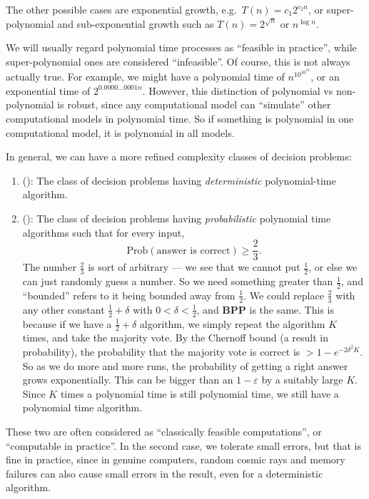 The other possible cases are exponential growth, e.g.\ $T(n) = c_1 2^{c_2 n}$, or super-polynomial and sub-exponential growth such as $T(n) = 2^{\sqrt{n}}$ or $n^{\log n}$.

We will usually regard polynomial time processes as ``feasible in practice'', while super-polynomial ones are considered ``infeasible''. Of course, this is not always actually true. For example, we might have a polynomial time of $n^{10^{10^{10}}}$, or an exponential time of $2^{0.0000\ldots0001 n}$. However, this distinction of polynomial vs non-polynomial is robust, since any computational model can ``simulate'' other computational models in polynomial time. So if something is polynomial in one computational model, it is polynomial in all models.

In general, we can have a more refined complexity classes of decision problems:
\begin{enumerate}
  \item {} (): The class of decision problems having \emph{deterministic} polynomial-time algorithm.
  \item {} (): The class of decision problems having \emph{probabilistic} polynomial time algorithms such that for every input,
    \[
      \mathrm{Prob}(\text{answer is correct}) \geq \frac{2}{3}.
    \]
    The number $\frac{2}{3}$ is sort of arbitrary --- we see that we cannot put $\frac{1}{2}$, or else we can just randomly guess a number. So we need something greater than $\frac{1}{2}$, and ``bounded'' refers to it being bounded away from $\frac{1}{2}$. We could replace $\frac{2}{3}$ with any other constant $\frac{1}{2} + \delta$ with $0 < \delta < \frac{1}{2}$, and \textbf{BPP} is the same. This is because if we have a $\frac{1}{2} + \delta$ algorithm, we simply repeat the algorithm $K$ times, and take the majority vote. By the Chernoff bound (a result in probability), the probability that the majority vote is correct is $> 1 - e^{-2 \delta^2 K}$. So as we do more and more runs, the probability of getting a right answer grows exponentially. This can be bigger than an $1 - \varepsilon$ by a suitably large $K$. Since $K$ times a polynomial time is still polynomial time, we still have a polynomial time algorithm.
\end{enumerate}
These two are often considered as ``classically feasible computations'', or ``computable in practice''. In the second case, we tolerate small errors, but that is fine in practice, since in genuine computers, random cosmic rays and memory failures can also cause small errors in the result, even for a deterministic algorithm.

